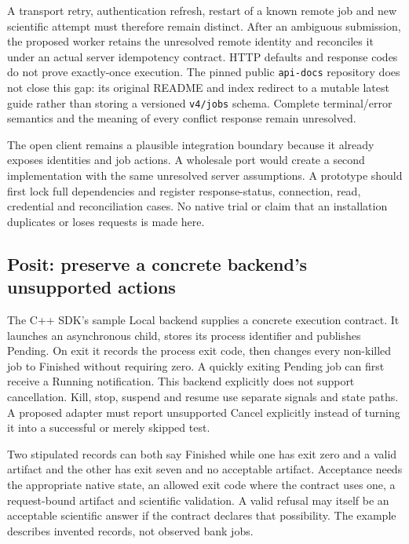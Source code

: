 A transport retry, authentication refresh, restart of a known remote job
and new scientific attempt must therefore remain distinct. After an
ambiguous submission, the proposed worker retains the unresolved remote
identity and reconciles it under an actual server idempotency contract.
HTTP defaults and response codes do not prove exactly-once execution.
The pinned public \texttt{api-docs} repository does not close this gap:
its original README and index redirect to a mutable latest guide rather
than storing a versioned \texttt{v4/jobs} schema. Complete terminal/error
semantics and the meaning of every conflict response remain unresolved.
\citep{exec24_workflow_contracts_domino}

The open client remains a plausible integration boundary because it already
exposes identities and job actions. A wholesale port would create a second
implementation with the same unresolved server assumptions. A prototype
should first lock full dependencies and register response-status,
connection, read, credential and reconciliation cases. No native trial or
claim that an installation duplicates or loses requests is made here.

\subsection{Posit: preserve a concrete backend's unsupported actions}

The C++ SDK's sample Local backend supplies a concrete execution contract.
It launches an asynchronous child, stores its process identifier and
publishes Pending. On exit it records the process exit code, then changes
every non-killed job to Finished without requiring zero. A quickly exiting
Pending job can first receive a Running notification. This backend explicitly
does not support cancellation. Kill, stop, suspend and resume use separate
signals and state paths. A proposed adapter must report unsupported Cancel
explicitly instead of turning it into a successful or merely skipped test.
\citep{exec24_workflow_contracts_posit}

Two stipulated records can both say Finished while one has exit zero and
a valid artifact and the other has exit seven and no acceptable artifact.
Acceptance needs the appropriate native state, an allowed exit code where
the contract uses one, a request-bound artifact and scientific validation.
A valid refusal may itself be an acceptable scientific answer if the contract
declares that possibility. The example describes invented records, not
observed bank jobs.~\citep{exec24_workflow_contracts_reference}

